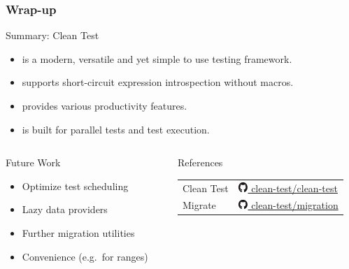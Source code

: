 \documentclass[10pt,aspectratio=169,utf8]{beamer}
\begin{document}
\begin{frame}
  \frametitle{Wrap-up}

  \vspace{8pt}
  \begin{exampleblock}{Summary: Clean Test}
    \begin{itemize}
      \item is a modern, versatile and yet simple to use testing framework.
      \item supports short-circuit expression introspection without macros.
      \item provides various productivity features.
      \item is built for parallel tests and test execution.
    \end{itemize}
  \end{exampleblock}

  \begin{columns}[onlytextwidth]
    \begin{column}{.48\textwidth}
      \begin{block}{Future Work}
        \parbox[c][.35\textheight][c]{\textwidth}{
          \begin{itemize}
            \item Optimize test scheduling
            \item Lazy data providers
            \item Further migration utilities
            \item Convenience (e.g.\ for ranges)
          \end{itemize}
        }
      \end{block}
    \end{column}

    \begin{column}{.48\textwidth}
      \begin{block}{References}
        \parbox[c][.35\textheight][c]{\textwidth}{
          \begin{tabular}{ @{}l l@{} }
            Clean Test &
            \href{%
              https://github.com/clean-test/clean-test
            }{%
              \includegraphics[height=10pt]{img/github} clean-test/clean-test
            } \\

            Migrate&
            \href{%
              https://github.com/clean-test/migration
            }{%
              \includegraphics[height=10pt]{img/github} clean-test/migration
            } \\


\end{tabular}}
\end{block}
\end{column}
\end{columns}
\end{frame}
\end{document}
